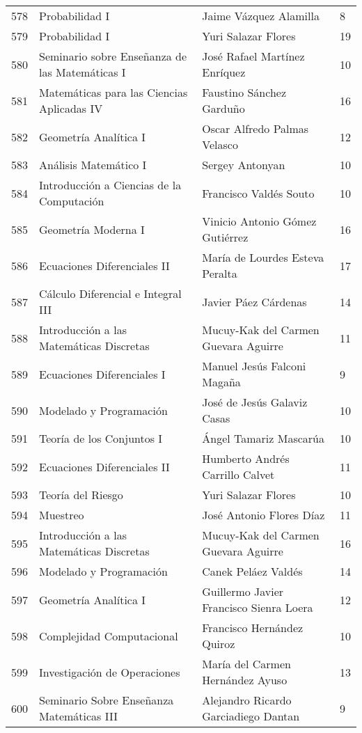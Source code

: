 \begin{table}[ht]
\begin{tabular}{rlll}
  578 & Probabilidad I & Jaime Vázquez Alamilla & 8 \\ 
  579 & Probabilidad I & Yuri Salazar Flores & 19 \\ 
  580 & Seminario sobre Enseñanza de las Matemáticas I & José Rafael Martínez Enríquez & 10 \\ 
  581 & Matemáticas para las Ciencias Aplicadas IV & Faustino Sánchez Garduño & 16 \\ 
  582 & Geometría Analítica I & Oscar Alfredo Palmas Velasco & 12 \\ 
  583 & Análisis Matemático I & Sergey Antonyan & 10 \\ 
  584 & Introducción a Ciencias de la Computación & Francisco Valdés Souto & 10 \\ 
  585 & Geometría Moderna I & Vinicio Antonio Gómez Gutiérrez & 16 \\ 
  586 & Ecuaciones Diferenciales II & María de Lourdes Esteva Peralta & 17 \\ 
  587 & Cálculo Diferencial e Integral III & Javier Páez Cárdenas & 14 \\ 
  588 & Introducción a las Matemáticas Discretas & Mucuy-Kak del Carmen Guevara Aguirre & 11 \\ 
  589 & Ecuaciones Diferenciales I & Manuel Jesús Falconi Magaña & 9 \\ 
  590 & Modelado y Programación & José de Jesús Galaviz Casas & 10 \\ 
  591 & Teoría de los Conjuntos I & Ángel Tamariz Mascarúa & 10 \\ 
  592 & Ecuaciones Diferenciales II & Humberto Andrés Carrillo Calvet & 11 \\ 
  593 & Teoría del Riesgo & Yuri Salazar Flores & 10 \\ 
  594 & Muestreo & José Antonio Flores Díaz & 11 \\ 
  595 & Introducción a las Matemáticas Discretas & Mucuy-Kak del Carmen Guevara Aguirre & 16 \\ 
  596 & Modelado y Programación & Canek Peláez Valdés & 14 \\ 
  597 & Geometría Analítica I & Guillermo Javier Francisco Sienra Loera & 12 \\ 
  598 & Complejidad Computacional & Francisco Hernández Quiroz & 10 \\ 
  599 & Investigación de Operaciones & María del Carmen Hernández Ayuso & 13 \\ 
  600 & Seminario Sobre Enseñanza Matemáticas III & Alejandro Ricardo Garciadiego Dantan & 9 \\ 

\end{tabular}
\end{table}
